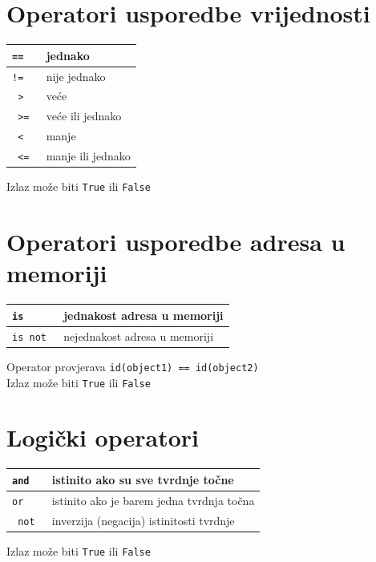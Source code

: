\documentclass[10pt]{article}
\begin{document}
    \section*{\color{NavyBlue} Operatori usporedbe vrijednosti}
    \begin{tabular}{|>{\tt}p{9.00cm}|>{}p{15.50cm}|}
        \hline
        ==      & jednako           \\ \hline
        !=      & nije jednako      \\ \hline
        >       & veće              \\ \hline
        >=      & veće ili jednako  \\ \hline
        <       & manje             \\ \hline
        <=      & manje ili jednako \\ \hline
    \end{tabular}
    \begin{center}
        \footnotesize
        Izlaz može biti \texttt{True} ili \texttt{False}
    \end{center}

    \section*{\color{NavyBlue} Operatori usporedbe adresa u memoriji}
    \begin{tabular}{|>{\tt}p{9.00cm}|>{}p{15.50cm}|}
        \hline
        is      & jednakost adresa u memoriji \\ \hline
        is not  & nejednakost adresa u memoriji \\ \hline
    \end{tabular}
    \begin{center}
        \footnotesize
        Operator provjerava \texttt{id(object1) == id(object2)} \\
        Izlaz može biti \texttt{True} ili \texttt{False}
    \end{center}

    \section*{\color{NavyBlue} Logički operatori}
    \begin{tabular}{|>{\tt}p{9.00cm}|>{}p{15.50cm}|}
        \hline
        and   & istinito ako su sve tvrdnje točne           \\ \hline
        or    & istinito ako je barem jedna tvrdnja točna   \\ \hline
        not   & inverzija (negacija) istinitosti tvrdnje    \\ \hline
    \end{tabular}
    \begin{center}
        \footnotesize
        Izlaz može biti \texttt{True} ili \texttt{False}
    \end{center}
\end{document}
